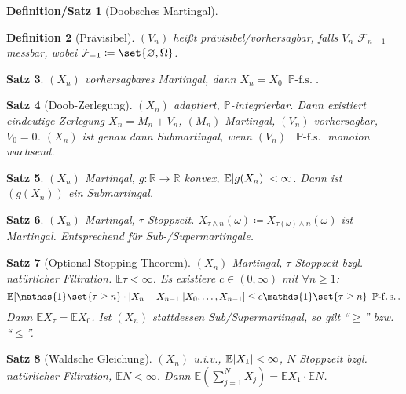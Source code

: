 \documentclass[a4paper,8pt]{article}
\newcounter{Sec}
\theoremstyle{nonumberbreak}
\newtheorem{definition}{Definition}[Sec]
\newtheorem{satz}[definition]{Satz}
\newtheorem{defsatz}[definition]{Definition/Satz}
\newcommand{\defas}{\coloneqq}
\newcommand{\ind}{\mathds{1}}
\renewcommand{\P}{\mathbb{P}}
\newcommand{\R}{\mathbb{R}}
\newcommand{\F}{\mathcal{F}}
\newcommand{\E}{\mathbb{E}}
\newcommand{\EV}[2]{\E[#1|#2]}
\newcommand{\fs}[1]{~\operatorname{#1-f.s.}}
\begin{document}
\begin{multicols*}{3}
\begin{defsatz}[Doobsches Martingal]
	\end{defsatz}
	\begin{definition}[Prävisibel]
		$(V_n)$ heißt prävisibel/vorhersagbar, falls $V_n$ $\F_{n-1}$ messbar,
		wobei $\F_{-1}\defas\set{\varnothing,\Omega}$.
	\end{definition}
	\begin{satz}
		$(X_n)$ vorhersagbares Martingal, dann $X_n=X_0\fs\P$.
	\end{satz}
	\begin{satz}[Doob-Zerlegung]
		$(X_n)$ adaptiert, $\P$-integrierbar. Dann existiert eindeutige Zerlegung
		$X_n=M_n+V_n$, $(M_n)$ Martingal, $(V_n)$ vorhersagbar, $V_0=0$.
		$(X_n)$ ist genau dann Submartingal, wenn $(V_n)$ $\fs\P$ monoton wachsend.
	\end{satz}
	\begin{satz}
		$(X_n)$ Martingal, $g\colon\R\to\R$ konvex, $\E\abs{g(X_n)}<\infty$. Dann
		ist $(g(X_n))$ ein Submartingal.
	\end{satz}
	\begin{satz}
		$(X_n)$ Martingal, $\tau$ Stoppzeit. $X_{\tau\wedge n}(\omega)\defas X_{\tau(\omega)\wedge n}(\omega)$
		ist Martingal. Entsprechend für Sub-/Supermartingale.
	\end{satz}
	\begin{satz}[Optional Stopping Theorem]
		$(X_n)$ Martingal, $\tau$ Stoppzeit bzgl. natürlicher Filtration. $\E\tau<\infty$.
		Es existiere $c\in(0,\infty)$ mit $\forall n\geq 1$:
		\[
			\EV{\ind\set{\tau\geq n}\cdot\abs{X_n-X_{n-1}}}{X_0,\ldots,X_{n-1}}\leq c\ind\set{\tau\geq n}\fs\P.
		\]
		Dann $\E X_\tau = \E X_0$. Ist $(X_n)$ stattdessen Sub/Supermartingal, so
		gilt \enquote{$\geq$} bzw. \enquote{$\leq$}.
	\end{satz}
	\begin{satz}[Waldsche Gleichung]
		$(X_n)$ u.i.v., $\E\abs{X_1}<\infty$, $N$ Stoppzeit bzgl. natürlicher Filtration,
		$\E N<\infty$. Dann $\E(\sum_{j=1}^N X_j) = \E X_1\cdot \E N$.
	\end{satz}

\end{multicols*}
\end{document}
